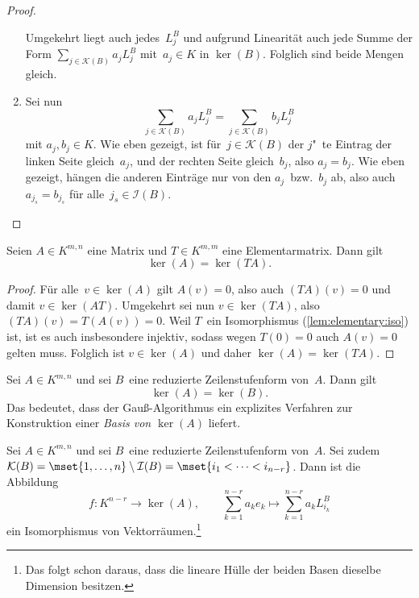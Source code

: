 \documentclass[a4paper]{article}
\begin{document}
\begin{proof}
\begin{enumerate}
              Umgekehrt liegt auch jedes~$L_j^B$ und aufgrund Linearität auch jede Summe der Form $\sum_{j\in\mathcal{K}(B)} a_jL_j^B$ mit~$a_j \in K$ in $\ker(B)$. Folglich sind beide Mengen gleich.
        \item Sei nun
              \begin{equation*}
                  \sum_{j\in\mathcal{K}(B)} a_jL_j^B = \sum_{j\in\mathcal{K}(B)} b_jL_j^B
              \end{equation*}
              mit $a_j,b_j \in K$. Wie eben gezeigt, ist für~$j \in \mathcal{K}(B)$ der $j$"~te Eintrag der linken Seite gleich~$a_j$, und der rechten Seite gleich~$b_j$, also $a_j = b_j$. Wie eben gezeigt, hängen die anderen Einträge nur von den $a_j$~bzw.~$b_j$ ab, also auch $a_{j_s} = b_{j_s}$ für alle~$j_s \in \mathcal{I}(B)$.\qedhere
    \end{enumerate}
\end{proof}

\begin{lemma}
    Seien $A \in K^{m,n}$ eine Matrix und $T \in K^{m,m}$ eine Elementarmatrix. Dann gilt
    \begin{equation*}
        \ker(A) = \ker(TA).
    \end{equation*}
\end{lemma}

\begin{proof}
    Für alle~$v \in \ker(A)$ gilt $A(v) = 0$, also auch $(TA)(v) = 0$ und damit $v \in \ker(AT)$. Umgekehrt sei nun $v \in \ker(TA)$, also $(TA)(v) = T(A(v)) = 0$. Weil $T$~ein Isomorphismus (\cref{lem:elementary:iso}) ist, ist es auch insbesondere injektiv, sodass wegen $T(0) = 0$ auch $A(v) = 0$ gelten muss. Folglich ist $v \in \ker(A)$ und daher $\ker(A) = \ker(TA)$.
\end{proof}

\begin{corollary}
    Sei $A \in K^{m,n}$ und sei $B$~eine reduzierte Zeilenstufenform von~$A$. Dann gilt
    \begin{equation*}
        \ker(A) = \ker(B).
    \end{equation*}
    Das bedeutet, dass der Gauß-Algorithmus ein explizites Verfahren zur Konstruktion einer \emph{Basis von $\ker(A)$} liefert.
\end{corollary}

\begin{theorem}
    Sei $A \in K^{m,n}$ und sei $B$~eine reduzierte Zeilenstufenform von~$A$. Sei zudem $\mathcal{K}(B) = \mset{1,\dots,n} \setminus \mathcal{I}(B) = \mset{i_1 < \dots < i_{n-r}}$. Dann ist die Abbildung
    \begin{equation*}
        f\colon K^{n-r} \to \ker(A),\qquad \sum_{k=1}^{n-r} a_ke_k \mapsto \sum_{k=1}^{n-r} a_kL_{i_k}^B
    \end{equation*}
    ein Isomorphismus von Vektorräumen.\footnote{Das folgt schon daraus, dass die lineare Hülle der beiden Basen dieselbe Dimension besitzen.}
\end{theorem}
\end{document}
